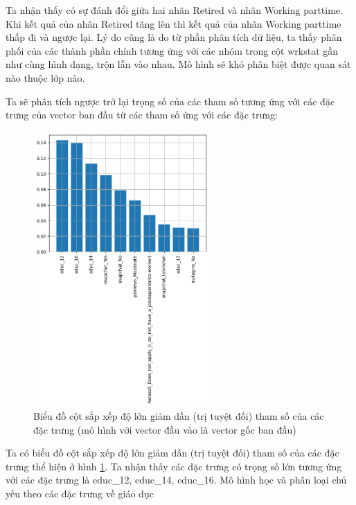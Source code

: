 \begin{enumerate}[label=(\alph*)]
    Ta nhận thấy có sự đánh đổi giữa hai nhãn Retired và nhãn Working parttime.
    Khi kết quả của nhãn Retired tăng lên thì kết quả của nhãn Working parttime thấp đi và ngược lại.
    Lý do cũng là do từ phần phân tích dữ liệu, ta thấy phân phối của các thành phần chính tương ứng với các nhóm trong cột wrkstat gần như cùng hình dạng, trộn lẫn vào nhau.
    Mô hình sẽ khó phân biệt được quan sát nào thuộc lớp nào.

    Ta sẽ phân tích ngược trở lại trọng số của các tham số tương ứng với các đặc trưng của vector ban đầu từ các tham số ứng với các đặc trưng:

    \begin{figure}[H]
        \centering
        \includegraphics[width=0.6\textwidth]{figures/Thanh/Models/AdaBoost/With_null_models_Feature_Importance_AdaBoost_original_features.png}
        \caption{Biểu đồ cột sắp xếp độ lớn giảm dần (trị tuyệt đối) tham số của các đặc trưng (mô hình với vector đầu vào là vector gốc ban đầu)}
        \label{fig:With_null_models_Feature_Importance_AdaBoost_original_features}
    \end{figure}

    Ta có biểu đồ cột sắp xếp độ lớn giảm dần (trị tuyệt đối) tham số của các đặc trưng thể hiện ở hình \ref{fig:With_null_models_Feature_Importance_AdaBoost_original_features}.
    Ta nhận thấy các đặc trưng có trọng số lớn tương ứng với các đặc trưng là educ\_12, educ\_14, educ\_16.
    Mô hình học và phân loại chủ yếu theo các đặc trưng về giáo dục
\end{enumerate}